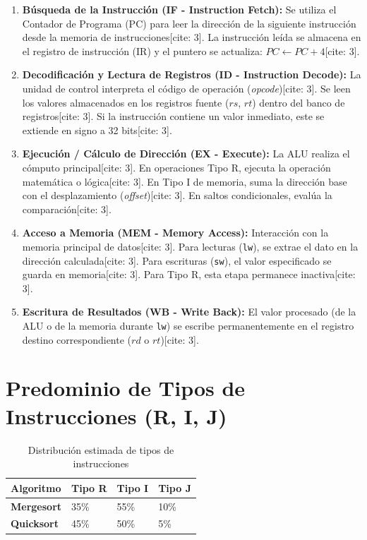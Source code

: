 \documentclass[12pt,a4paper]{article}
\begin{document}
\begin{enumerate}
    \item \textbf{Búsqueda de la Instrucción (IF - Instruction Fetch):} Se utiliza el Contador de Programa (PC) para leer la dirección de la siguiente instrucción desde la memoria de instrucciones[cite: 3]. La instrucción leída se almacena en el registro de instrucción (IR) y el puntero se actualiza: $PC \leftarrow PC + 4$[cite: 3].
    \item \textbf{Decodificación y Lectura de Registros (ID - Instruction Decode):} La unidad de control interpreta el código de operación (\textit{opcode})[cite: 3]. Se leen los valores almacenados en los registros fuente ($rs$, $rt$) dentro del banco de registros[cite: 3]. Si la instrucción contiene un valor inmediato, este se extiende en signo a 32 bits[cite: 3].
    \item \textbf{Ejecución / Cálculo de Dirección (EX - Execute):} La ALU realiza el cómputo principal[cite: 3]. En operaciones Tipo R, ejecuta la operación matemática o lógica[cite: 3]. En Tipo I de memoria, suma la dirección base con el desplazamiento (\textit{offset})[cite: 3]. En saltos condicionales, evalúa la comparación[cite: 3].
    \item \textbf{Acceso a Memoria (MEM - Memory Access):} Interacción con la memoria principal de datos[cite: 3]. Para lecturas (\texttt{lw}), se extrae el dato en la dirección calculada[cite: 3]. Para escrituras (\texttt{sw}), el valor especificado se guarda en memoria[cite: 3]. Para Tipo R, esta etapa permanece inactiva[cite: 3].
    \item \textbf{Escritura de Resultados (WB - Write Back):} El valor procesado (de la ALU o de la memoria durante \texttt{lw}) se escribe permanentemente en el registro destino correspondiente ($rd$ o $rt$)[cite: 3].
\end{enumerate}


\section{Predominio de Tipos de Instrucciones (R, I, J)}

\begin{table}[h!]
\centering
\caption{Distribución estimada de tipos de instrucciones}
\vspace{0.2cm}
\begin{tabular}{llll}
\toprule
\textbf{Algoritmo} & \textbf{Tipo R} & \textbf{Tipo I} & \textbf{Tipo J} \\
\midrule
\textbf{Mergesort} & 35\% & 55\% & 10\% \\
\textbf{Quicksort} & 45\% & 50\% & 5\% \\
\bottomrule
\end{tabular}
\end{table}
\end{document}
